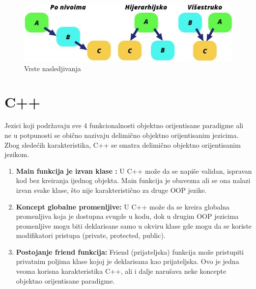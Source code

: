 \documentclass[a4paper]{article}
\begin{document}
\begin{figure}[h!]
\begin{center}
\includegraphics[scale=0.6]{slike/nasledjivanje.jpg}
\end{center}
\caption{Vrste nasledjivanja}
\label{fig:VrsteNasledjivanja}
\end{figure}

\newpage

\section{C++}
\label{sec:c++}
Jezici koji podržavaju sve 4 funkcionalnosti objektno orijentisane paradigme ali ne u potpunosti se obično nazivaju delimično objektno orijentisanim jezicima. Zbog sledećih karakteristika, C++ se smatra delimično objektno orijentisanim jezikom.
\begin{enumerate}
\item \textbf{Main funkcija je izvan klase :} U C++ može da se napiše validan, ispravan kod bez kreiranja ijednog objekta. Main funkcija je obavezna ali se ona nalazi izvan svake klase, što nije karakteristično za druge OOP jezike.
\item \textbf{Koncept globalne promenljive:} U C++ može da se kreira globalna promenljiva koja je dostupna svugde u kodu, dok u drugim OOP jezicima promenljive mogu biti deklarisane samo u okviru klase gde mogu da se koriste modifikatori pristupa (private, protected, public).
\item \textbf{Postojanje friend funkcija:} Friend (prijateljska) funkcija može pristupiti privatnim poljima klase kojoj je deklarisana kao prijateljska. Ovo je jedna veoma korisna karakteristika C++, ali i dalje narušava neke koncepte objektno orijentisane paradigme.
\end{enumerate}
\end{document}
